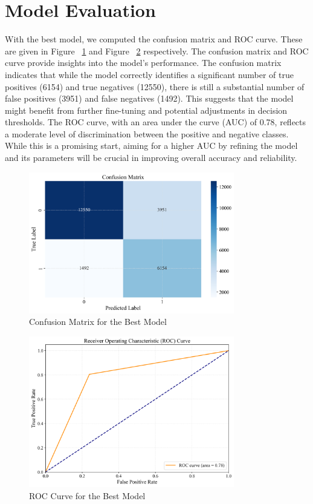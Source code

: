 \section {Model Evaluation}
\label{sec:chap4 section 2}
With the best model, we computed the confusion matrix and ROC curve. These are given in Figure ~\ref{fig:cha-4 figure2} and Figure ~\ref{fig:cha-4 figure3} respectively. The confusion matrix and ROC curve provide insights into the model's performance. The confusion matrix indicates that while the model correctly identifies a significant number of true positives (6154) and true negatives (12550), there is still a substantial number of false positives (3951) and false negatives (1492). This suggests that the model might benefit from further fine-tuning and potential adjustments in decision thresholds. The ROC curve, with an area under the curve (AUC) of 0.78, reflects a moderate level of discrimination between the positive and negative classes. While this is a promising start, aiming for a higher AUC by refining the model and its parameters will be crucial in improving overall accuracy and reliability.

\begin{figure}
    \centering
    \includegraphics[width=0.8\textwidth]{figures/Figure33.png}
    \caption{Confusion Matrix for the Best Model}
    \label{fig:cha-4 figure2}
\end{figure}

\begin{figure}
    \centering
    \includegraphics[width=0.8\textwidth]{figures/Figure34.png}
    \caption{ROC Curve for the Best Model}
    \label{fig:cha-4 figure3}
\end{figure}

